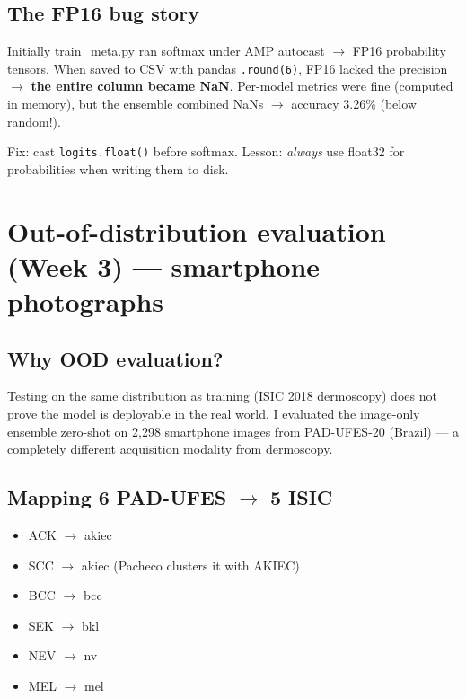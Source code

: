\documentclass[11pt,a4paper]{article}
\begin{document}
\subsection{The FP16 bug story}

\begin{example}
Initially train\_meta.py ran softmax under AMP autocast $\to$ FP16 probability tensors. When saved to CSV with pandas \texttt{.round(6)}, FP16 lacked the precision $\to$ \textbf{the entire column became NaN}. Per-model metrics were fine (computed in memory), but the ensemble combined NaNs $\to$ accuracy 3.26\% (below random!).

Fix: cast \texttt{logits.float()} before softmax. Lesson: \textit{always} use float32 for probabilities when writing them to disk.
\end{example}

\section{Out-of-distribution evaluation (Week 3) --- smartphone photographs}

\subsection{Why OOD evaluation?}

\begin{simple}
Testing on the same distribution as training (ISIC 2018 dermoscopy) does not prove the model is deployable in the real world. I evaluated the image-only ensemble zero-shot on 2{,}298 smartphone images from PAD-UFES-20 (Brazil) --- a completely different acquisition modality from dermoscopy.
\end{simple}

\subsection{Mapping 6 PAD-UFES $\to$ 5 ISIC}

\begin{itemize}[leftmargin=*]
  \item ACK $\to$ akiec
  \item SCC $\to$ akiec (Pacheco clusters it with AKIEC)
  \item BCC $\to$ bcc
  \item SEK $\to$ bkl
  \item NEV $\to$ nv
  \item MEL $\to$ mel
\end{itemize}
\end{document}
